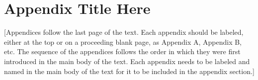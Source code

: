 \chapter{Appendix Title Here}\label{apd:b}

[Appendices follow the last page of the text. Each appendix should be labeled, either at the top or on a proceeding blank page, as Appendix A, Appendix B, etc. The sequence of the appendices follows the order in which they were first introduced in the main body of the text. Each appendix needs to be labeled and named in the main body of the text for it to be included in the appendix section.]